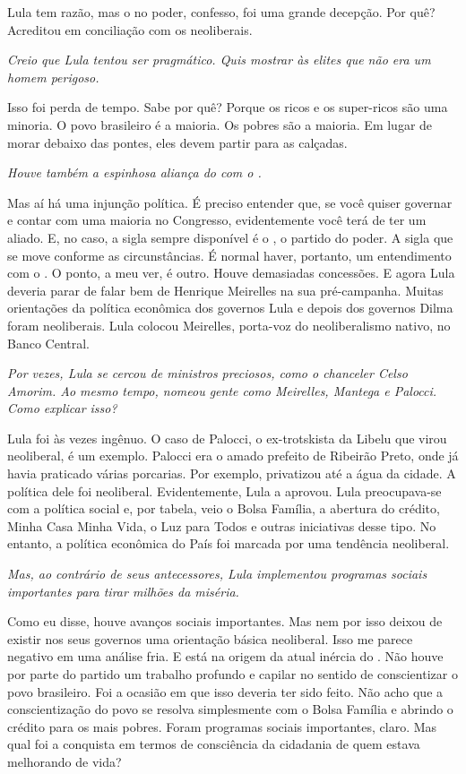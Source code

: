 \normalfont 
Lula tem razão, mas o  no poder, confesso, foi uma
grande decepção. Por quê? Acreditou em conciliação com os neoliberais.

\itshape
Creio que Lula tentou ser pragmático. Quis mostrar às
elites que não era um homem perigoso.

\normalfont 
Isso foi perda de tempo. Sabe por quê? Porque os ricos e
os super-ricos são uma minoria. O povo brasileiro é a maioria. Os pobres
são a maioria. Em lugar de morar debaixo das pontes, eles devem partir
para as calçadas.

\itshape
Houve também a espinhosa aliança do  com o .

\normalfont 
Mas aí há uma injunção política. É preciso entender que,
se você quiser governar e contar com uma maioria no Congresso,
evidentemente você terá de ter um aliado. E, no caso, a sigla sempre
disponível é o , o partido do poder. A sigla que se move conforme as
circunstâncias. É normal haver, portanto, um entendimento com o . O
ponto, a meu ver, é outro. Houve demasiadas concessões. E agora Lula
deveria parar de falar bem de Henrique Meirelles na sua pré-campanha.
Muitas orientações da política econômica dos governos Lula e depois dos
governos Dilma foram neoliberais. Lula colocou Meirelles, porta-voz do
neoliberalismo nativo, no Banco Central.

\itshape
Por vezes, Lula se cercou de ministros preciosos, como
o chanceler Celso Amorim. Ao mesmo tempo, nomeou gente como Meirelles,
Mantega e Palocci. Como explicar isso?

\normalfont 
Lula foi às vezes ingênuo. O caso de Palocci, o
ex-trotskista da Libelu que virou neoliberal, é um exemplo. Palocci era
o amado prefeito de Ribeirão Preto, onde já havia praticado várias
porcarias. Por exemplo, privatizou até a água da cidade. A política dele
foi neoliberal. Evidentemente, Lula a aprovou. Lula preocupava-se com a
política social e, por tabela, veio o Bolsa Família, a abertura do
crédito, Minha Casa Minha Vida, o Luz para Todos e outras iniciativas
desse tipo. No entanto, a política econômica do País foi marcada por uma
tendência neoliberal.

\itshape
Mas, ao contrário de seus antecessores, Lula
implementou programas sociais importantes para tirar milhões da miséria.

\normalfont 
Como eu disse, houve avanços sociais importantes. Mas nem
por isso deixou de existir nos seus governos uma orientação básica
neoliberal. Isso me parece negativo em uma análise fria. E está na
origem da atual inércia do . Não houve por parte do partido um
trabalho profundo e capilar no sentido de conscientizar o povo
brasileiro. Foi a ocasião em que isso deveria ter sido feito. Não acho
que a conscientização do povo se resolva simplesmente com o Bolsa
Família e abrindo o crédito para os mais pobres. Foram programas sociais
importantes, claro. Mas qual foi a conquista em termos de consciência da
cidadania de quem estava melhorando de vida?

